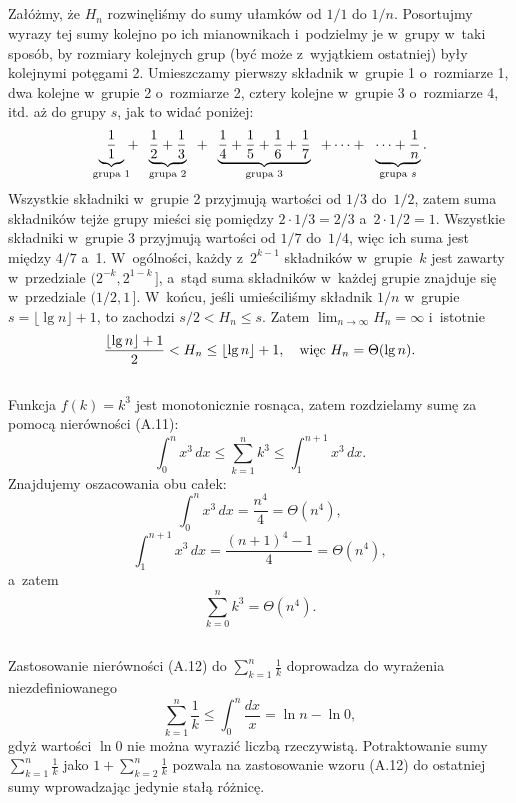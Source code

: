 \subsection{} %
Załóżmy, że $H_n$ rozwinęliśmy do sumy ułamków od $1/1$ do $1/n$. Posortujmy wyrazy tej sumy kolejno po ich mianownikach i~podzielmy je w~grupy w~taki sposób, by rozmiary kolejnych grup (być może z~wyjątkiem ostatniej) były kolejnymi potęgami 2. Umieszczamy pierwszy składnik w~grupie 1 o~rozmiarze 1, dwa kolejne w~grupie 2 o~rozmiarze 2, cztery kolejne w~grupie 3 o~rozmiarze 4, itd. aż do grupy $s$, jak to widać poniżej:
\[
	\underbrace{\frac{1}{1}}_{\hbox{\scriptsize grupa 1}}\!\!+\;\;\underbrace{\frac{1}{2}+\frac{1}{3}}_{\hbox{\scriptsize grupa 2}}\;\;+\;\;\underbrace{\frac{1}{4}+\frac{1}{5}+\frac{1}{6}+\frac{1}{7}}_{\hbox{\scriptsize grupa 3}}\;\;+\cdots+\;\;\underbrace{\cdots +\frac{1}{n}}_{\hbox{\scriptsize grupa $s$}}.
\]
Wszystkie składniki w~grupie 2 przyjmują wartości od $1/3$ do~$1/2$, zatem suma składników tejże grupy mieści się pomiędzy $2\cdot1/3=2/3$ a~$2\cdot1/2=1$. Wszystkie składniki w~grupie 3 przyjmują wartości od $1/7$ do~$1/4$, więc ich suma jest między $4/7$ a~1. W~ogólności, każdy z~$2^{k-1}$ składników w~grupie~$k$ jest zawarty w~przedziale $\bigl(2^{-k},2^{1-k}\,\bigr]$, a~stąd suma składników w~każdej grupie znajduje się w~przedziale $(1/2,1\,]$. W~końcu, jeśli umieściliśmy składnik $1/n$ w~grupie $s = \lfloor\lg n\rfloor+1$, to zachodzi $s/2<H_n\le s$. Zatem $\lim_{n\to\infty}H_n=\infty$ i~istotnie
\[
	\frac{\lfloor\lg n\rfloor+1}{2} < H_n \le \lfloor\lg n\rfloor+1,\quad\hbox{więc }H_n = \Theta(\lg n).
\]

\subsection{} %
Funkcja $f(k)=k^3$ jest monotonicznie rosnąca, zatem rozdzielamy sumę za pomocą nierówności (A.11):
\begin{equation*}
	\int_0^nx^3\,dx \le \sum_{k=1}^nk^3 \le \int_1^{n+1}x^3\,dx.
\end{equation*}
Znajdujemy oszacowania obu całek:
\[
	\int_0^nx^3\,dx = \frac{n^4}{4} = \Theta(n^4),
\]
\[
	\int_1^{n+1}x^3\,dx = \frac{(n+1)^4-1}{4} = \Theta(n^4),
\]
a~zatem
\[
	\sum_{k=0}^nk^3 = \Theta(n^4).
\]

\subsection{} %
Zastosowanie nierówności (A.12) do $\sum_{k=1}^n\frac{1}{k}$ doprowadza do wyrażenia niezdefiniowanego
\[
	\sum_{k=1}^n\frac{1}{k} \le \int_0^n\frac{dx}{x} = \ln n-\ln 0,
\]
gdyż wartości $\ln0$ nie można wyrazić liczbą rzeczywistą. Potraktowanie sumy $\sum_{k=1}^n\frac{1}{k}$ jako $1+\sum_{k=2}^n\frac{1}{k}$ pozwala na zastosowanie wzoru (A.12) do ostatniej sumy wprowadzając jedynie stałą różnicę.

